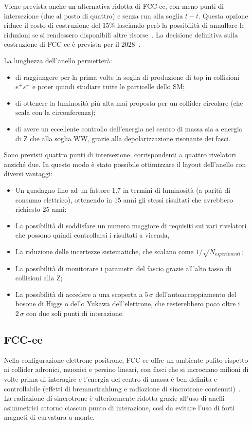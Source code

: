 Viene prevista anche un alternativa ridotta di FCC-ee, con meno punti di intersezione (due al posto di quattro) e senza run alla soglia $t-\bar t$. Questa opzione riduce il costo di costruzione del 15\% lasciando però la possibilità di annullare le riduzioni se si rendessero disponibili altre risorse~\cite{ESPP:2026-Res}. La decisione definitiva sulla costruzione di FCC-ee è prevista per il 2028~\cite{CERNCourier:ESPP2026}. 

La lunghezza dell'anello permetterà:
\begin{itemize}
    \item di raggiungere per la prima volte la soglia di produzione di top in collisioni $e^+s^-$ e poter quindi studiare tutte le particelle dello SM;
    \item di ottenere la luminosità più alta mai proposta per un collider circolare (che scala con la circonferenza);
    \item di avere un eccellente controllo dell'energia nel centro di massa sia a energia di Z che alla soglia WW, grazie alla depolarizzazione risonante dei fasci.
\end{itemize}

Sono previsti quattro punti di intersezione, corrispondenti a quattro rivelatori anziché due. In questo modo è stato possibile ottimizzare il layout dell'anello con diversi vantaggi:
\begin{itemize}
    \item Un guadagno fino ad un fattore 1.7 in termini di luminosità (a parità di consumo elettrico), ottenendo in 15 anni gli stessi risultati che avrebbero richiesto 25 anni;
    \item La possibilità di soddisfare un numero maggiore di requisiti sui vari rivelatori che possono quindi controllarsi i risultati a vicenda,
    \item La riduzione delle incertezze sistematiche, che scalano come $1/\sqrt{N_{esperimenti}}$;
    \item La possibilità di monitorare i parametri del fascio grazie all'alto tasso di collisioni alla Z;
    \item La possibilità di accedere a una scoperta a $5\,\sigma$ dell'autoaccoppiamento del bosone di Higgs o dello Yukawa dell'elettrone, che resterebbero poco oltre i $2\,\sigma$ con due soli punti di interazione.
\end{itemize}

\subsection{FCC-ee}
Nella configurazione elettrone-positrone, FCC-ee offre un ambiente pulito rispetto ai collider adronici, muonici e persino lineari, con fasci che si incrociano milioni di volte prima di interagire e l'energia del centro di massa è ben definita e controllabile (effetti di bremmstrahlung e radiazione di sincrotrone contenuti)~\cite{FCC:FSR-v1}. La radiazione di sincrotrone è ulteriormente ridotta grazie all'uso di anelli asimmetrici attorno ciascun punto di interazione, così da evitare l'uso di forti magneti di curvatura a monte. 

